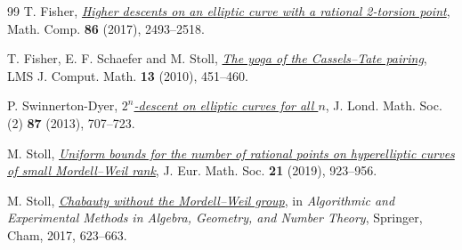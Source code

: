 \begin{thebibliography}{99}
T. Fisher, \href{https://doi.org/10.1090/mcom/3163}{\emph{Higher descents on an elliptic curve with a rational 2-torsion point}}, Math. Comp. \textbf{86} (2017), 2493--2518.

T. Fisher, E. F. Schaefer and M. Stoll, \href{https://doi.org/10.1112/S1461157010000185}{\emph{The yoga of the Cassels--Tate pairing}}, LMS J. Comput. Math. \textbf{13} (2010), 451--460.

P. Swinnerton-Dyer, \href{https://doi.org/10.1112/jlms/jds063}{\emph{\(2^n\)-descent on elliptic curves for all \(n\)}}, J. Lond. Math. Soc. (2) \textbf{87} (2013), 707--723.

M. Stoll, \href{https://doi.org/10.4171/JEMS/857}{\emph{Uniform bounds for the number of rational points on hyperelliptic curves of small Mordell--Weil rank}}, J. Eur. Math. Soc. \textbf{21} (2019), 923--956.

M. Stoll, \href{https://doi.org/10.1007/978-3-319-70566-8_28}{\emph{Chabauty without the Mordell--Weil group}}, in \emph{Algorithmic and Experimental Methods in Algebra, Geometry, and Number Theory}, Springer, Cham, 2017, 623--663.
\end{thebibliography}
